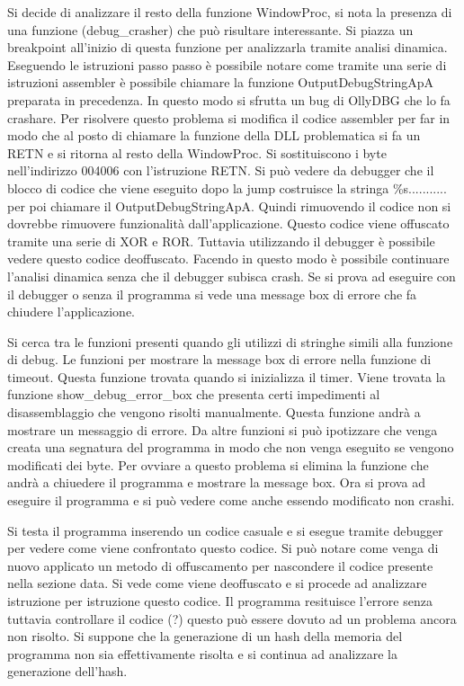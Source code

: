 \documentclass[a4paper,10pt]{article}
\begin{document}
Si decide di analizzare il resto della funzione WindowProc, si nota la presenza di una funzione (debug\_crasher) che può risultare interessante. Si piazza un breakpoint all'inizio di questa funzione per analizzarla tramite analisi dinamica. Eseguendo le istruzioni passo passo è possibile notare come tramite una serie di istruzioni assembler è possibile chiamare la funzione OutputDebugStringApA preparata in precedenza. In questo modo si sfrutta un bug di OllyDBG che lo fa crashare. Per risolvere questo problema si modifica il codice assembler per far in modo che al posto di chiamare la funzione della DLL problematica si fa un RETN e si ritorna al resto della WindowProc. Si sostituiscono i byte nell'indirizzo 004006 con l'istruzione RETN. Si può vedere da debugger che il blocco di codice che viene eseguito dopo la jump costruisce la stringa \%s........... per poi chiamare il OutputDebugStringApA. Quindi rimuovendo il codice non si dovrebbe rimuovere funzionalità dall'applicazione. Questo codice viene offuscato tramite una serie di XOR  e ROR. Tuttavia utilizzando il debugger è possibile vedere questo codice deoffuscato.
Facendo in questo modo è possibile continuare l'analisi dinamica senza che il debugger subisca crash. Se si prova ad eseguire con il debugger o senza il programma si vede una message box di errore che fa chiudere l'applicazione.

Si cerca tra le funzioni presenti quando gli utilizzi di stringhe simili alla funzione di debug. Le funzioni per mostrare la message box di errore nella funzione di timeout. Questa funzione trovata quando si inizializza il timer.
Viene trovata la funzione show\_debug\_error\_box che presenta certi impedimenti al disassemblaggio che vengono risolti manualmente. Questa funzione andrà a mostrare un messaggio di errore. Da altre funzioni si può ipotizzare che venga creata una segnatura del programma in modo che non venga eseguito se vengono modificati dei byte. Per ovviare a questo problema si elimina la funzione che andrà a chiuedere il programma e mostrare la message box.
Ora si prova ad eseguire il programma e si può vedere come anche essendo modificato non crashi.

Si testa il programma inserendo un codice casuale e si esegue tramite debugger per vedere come viene confrontato questo codice. Si può notare come venga di nuovo applicato un metodo di offuscamento per nascondere il codice presente nella sezione data. Si vede come viene deoffuscato e si procede ad analizzare istruzione per istruzione questo codice. Il programma resituisce l'errore senza tuttavia controllare il codice (?) questo può essere dovuto ad un problema ancora non risolto. Si suppone che la generazione di un hash della memoria del programma non sia effettivamente risolta e si continua ad analizzare la generazione dell'hash.
\end{document}

